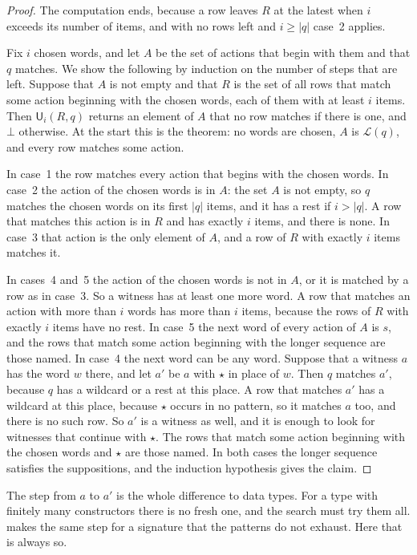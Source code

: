 \documentclass[acmsmall,nonacm,screen]{acmart}
\newcommand{\kw}[1]{\mathsf{#1}}
\newcommand{\lang}[1]{\mathcal{L}(#1)}
\newcommand{\U}{\kw{U}}
\newcommand{\fresh}{\star}
\begin{document}
\begin{proof}
The computation ends, because a row leaves $R$ at the latest when $i$ exceeds its number of
items, and with no rows left and $i \ge |q|$ case~2 applies.

Fix $i$ chosen words, and let $A$ be the set of actions that begin with them and that $q$
matches. We show the following by induction on the number of steps that are left. Suppose
that $A$ is not empty and that $R$ is the set of all rows that match some action beginning
with the chosen words, each of them with at least $i$ items. Then $\U_i(R, q)$ returns an
element of $A$ that no row matches if there is one, and $\bot$ otherwise. At the start this
is the theorem: no words are chosen, $A$ is $\lang{q}$, and every row matches some action.

In case~1 the row matches every action that begins with the chosen words. In case~2 the
action of the chosen words is in $A$: the set $A$ is not empty, so $q$ matches the chosen
words on its first $|q|$ items, and it has a rest if $i > |q|$. A row that matches this
action is in $R$ and has exactly $i$ items, and there is none. In case~3 that action is the
only element of $A$, and a row of $R$ with exactly $i$ items matches it.

In cases~4 and~5 the action of the chosen words is not in $A$, or it is matched by a row as
in case~3. So a witness has at least one more word. A row that matches an action with more
than $i$ words has more than $i$ items, because the rows of $R$ with exactly $i$ items have
no rest. In case~5 the next word of every action of $A$ is $s$, and the rows that match some
action beginning with the longer sequence are those named. In case~4 the next word can be any
word. Suppose that a witness $a$ has the word $w$ there, and let $a'$ be $a$ with $\fresh$ in
place of $w$. Then $q$ matches $a'$, because $q$ has a wildcard or a rest at this place. A
row that matches $a'$ has a wildcard at this place, because $\fresh$ occurs in no pattern, so
it matches $a$ too, and there is no such row. So $a'$ is a witness as well, and it is enough
to look for witnesses that continue with $\fresh$. The rows that match some action beginning
with the chosen words and $\fresh$ are those named. In both cases the longer sequence
satisfies the suppositions, and the induction hypothesis gives the claim.
\end{proof}

The step from $a$ to $a'$ is the whole difference to data types. For a type with finitely
many constructors there is no fresh one, and the search must try them all.
\citet{Maranget2007} makes the same step for a signature that the patterns do not exhaust.
Here that is always so.
\end{document}
